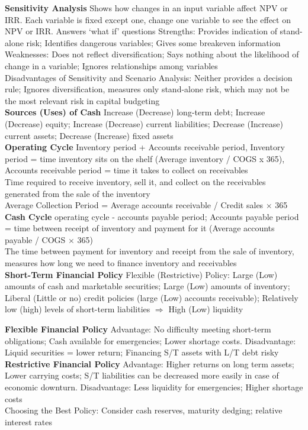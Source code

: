 \documentclass[12pt,landscape, a4paper]{article}
\theoremstyle{remark}
\begin{document}
\begin{multicols*}{3}
\textbf{Sensitivity Analysis} Shows how changes in an input variable affect NPV or IRR. Each variable is fixed except one, change one variable to see the effect on NPV or IRR. Answers `what if' questions
Strengths: Provides indication of stand-alone risk; Identifies dangerous variables; Gives some breakeven information\\
Weaknesses: Does not reflect diversification; Says nothing about the likelihood of change in a variable; Ignores relationships among variables\\

Disadvantages of Sensitivity and Scenario Analysis: Neither provides a decision rule; Ignores diversification, measures only stand-alone risk, which may not be the most relevant risk in capital budgeting\\

\textbf{Sources (Uses) of Cash} Increase (Decrease) long-term debt; Increase (Decrease) equity; Increase (Decrease) current liabilities; Decrease (Increase) current assets; Decrease (Increase) fixed assets\\

\textbf{Operating Cycle} Inventory period + Accounts receivable period, Inventory period = time inventory sits on the shelf (Average inventory / COGS x 365), Accounts receivable period = time it takes to collect on receivables \\
Time required to receive inventory, sell it, and collect on the receivables generated from the sale of the inventory\\
Average Collection Period = Average accounts receivable / Credit sales $\times$ 365\\

\textbf{Cash Cycle} operating cycle - accounts payable period; Accounts payable period = time between receipt of inventory and payment for it (Average accounts payable / COGS $\times$ 365)\\
The time between payment for inventory and receipt from the sale of inventory, measures how long we need to finance inventory and receivables\\

\textbf{Short-Term Financial Policy} Flexible (Restrictive) Policy: Large (Low) amounts of cash and marketable securities; Large (Low) amounts of inventory; Liberal (Little or no) credit policies (large (Low) accounts receivable); Relatively low (high) levels of short-term liabilities $\Rightarrow$ High (Low) liquidity

\textbf{Flexible Financial Policy} Advantage: No difficulty meeting short-term obligations; Cash available for emergencies; Lower shortage costs. Disadvantage: Liquid securities = lower return; Financing S/T assets with L/T debt risky\\
\textbf{Restrictive Financial Policy} Advantage: Higher returns on long term assets; Lower carrying costs; S/T liabilities can be decreased more easily in case of economic downturn. Disadvantage: Less liquidity for emergencies; Higher shortage costs\\
Choosing the Best Policy: Consider cash reserves, maturity dedging; relative interest rates\\


\end{multicols*}
\end{document}
